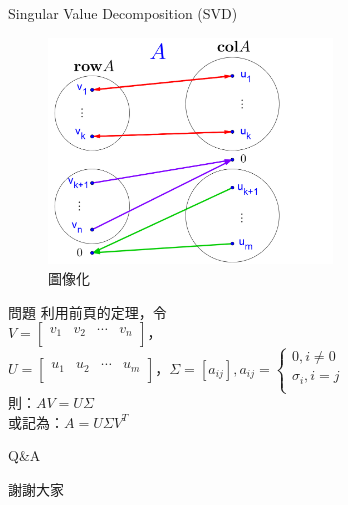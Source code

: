 \documentclass[14pt]{beamer}
\begin{document}
\begin{frame}{Singular Value Decomposition (SVD)}
	\begin{figure}[H]
		\centering
		\includegraphics[height=6cm]{map.png}
		\caption{圖像化}
		\label{fig:SVDmap}
	\end{figure}
\end{frame}
\begin{frame}{問題}
	利用前頁的定理，令\\$V=\left[ \begin{matrix}
	{{v}_{1}} & {{v}_{2}} & \cdots  & {{v}_{n}}  \\
	\end{matrix} \right]$，\\$U=\left[ \begin{matrix}
	{{u}_{1}} & {{u}_{2}} & \cdots  & {{u}_{m}}  \\
	\end{matrix} \right]$，$\Sigma=[a_{ij}],{{a}_{ij}}=\left\{ \begin{array}{*{35}{l}}
	0,i\ne 0  \\
	{{\sigma }_{i}},i=j  \\
	\end{array} \right.
	$\\
	則：$AV= U\Sigma$\\
	或記為：$A= U\Sigma{}V^T$
	
	
\end{frame}

\begin{frame}[standout]
	Q\&A
\end{frame}
\begin{frame}[standout]
	謝謝大家
\end{frame}
\end{document}
